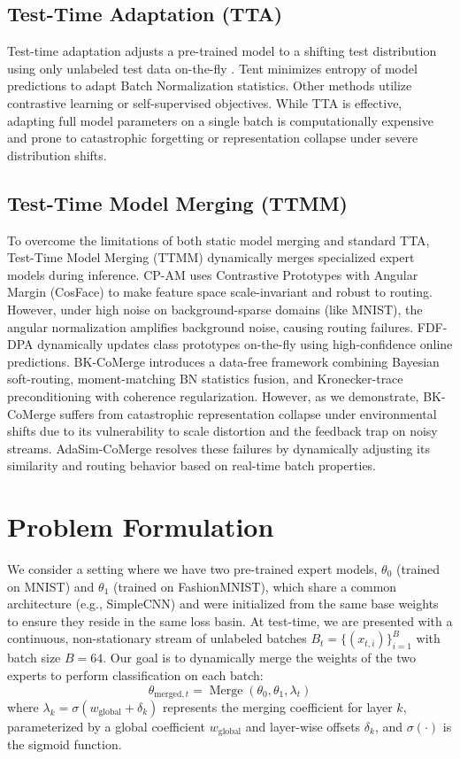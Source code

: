 \documentclass{article}
\theoremstyle{plain}
\theoremstyle{definition}
\theoremstyle{remark}
\begin{document}
\subsection{Test-Time Adaptation (TTA)}
Test-time adaptation adjusts a pre-trained model to a shifting test distribution using only unlabeled test data on-the-fly \cite{tent2021}. Tent \cite{tent2021} minimizes entropy of model predictions to adapt Batch Normalization statistics. Other methods utilize contrastive learning or self-supervised objectives. While TTA is effective, adapting full model parameters on a single batch is computationally expensive and prone to catastrophic forgetting or representation collapse under severe distribution shifts.

\subsection{Test-Time Model Merging (TTMM)}
To overcome the limitations of both static model merging and standard TTA, Test-Time Model Merging (TTMM) dynamically merges specialized expert models during inference. 
CP-AM uses Contrastive Prototypes with Angular Margin (CosFace) to make feature space scale-invariant and robust to routing. However, under high noise on background-sparse domains (like MNIST), the angular normalization amplifies background noise, causing routing failures.
FDF-DPA dynamically updates class prototypes on-the-fly using high-confidence online predictions.
BK-CoMerge introduces a data-free framework combining Bayesian soft-routing, moment-matching BN statistics fusion, and Kronecker-trace preconditioning with coherence regularization. However, as we demonstrate, BK-CoMerge suffers from catastrophic representation collapse under environmental shifts due to its vulnerability to scale distortion and the feedback trap on noisy streams. AdaSim-CoMerge resolves these failures by dynamically adjusting its similarity and routing behavior based on real-time batch properties.

\section{Problem Formulation}
\label{sec:formulation}

We consider a setting where we have two pre-trained expert models, $\theta_0$ (trained on MNIST) and $\theta_1$ (trained on FashionMNIST), which share a common architecture (e.g., SimpleCNN) and were initialized from the same base weights to ensure they reside in the same loss basin. At test-time, we are presented with a continuous, non-stationary stream of unlabeled batches $B_t = \{(x_{t,i})\}_{i=1}^B$ with batch size $B=64$. Our goal is to dynamically merge the weights of the two experts to perform classification on each batch:
\begin{equation}
    \theta_{\text{merged}, t} = \operatorname{Merge}(\theta_0, \theta_1, \lambda_t)
\end{equation}
where $\lambda_k = \sigma(w_{\text{global}} + \delta_k)$ represents the merging coefficient for layer $k$, parameterized by a global coefficient $w_{\text{global}}$ and layer-wise offsets $\delta_k$, and $\sigma(\cdot)$ is the sigmoid function.
\end{document}
